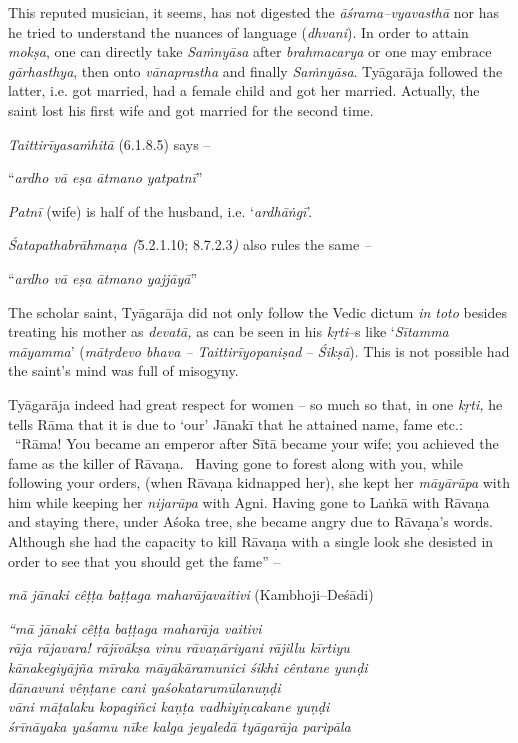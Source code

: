 This reputed musician, it seems, has not digested the \textit{āśrama–vyavasthā} nor has he tried to understand the nuances of language (\textit{dhvani}). In order to attain \textit{mokṣa}, one can directly take \textit{Saṁnyāsa} after \textit{brahmacarya} or one may embrace \textit{gārhasthya}, then onto \textit{vānaprastha} and finally \textit{Saṁnyāsa}. Tyāgarāja followed the latter, i.e. got married, had a female child and got her married. Actually, the saint lost his first wife and got married for the second time.

\textit{Taittirīyasaṁhitā} (6.1.8.5) says –

\begin{myquote}
“\textit{ardho vā eṣa ātmano yatpatnī}”
\end{myquote}

\textit{Patnī} (wife) is half of the husband, i.e. ‘\textit{ardhāṅgī}’.

\textit{Śatapathabrāhmaṇa (}5.2.1.10; 8.7.2.3\textit{)} also rules the same \textit{–}

\begin{myquote}
\textit{}“\textit{ardho vā eṣa ātmano yajjāyā}”
\end{myquote}

The scholar saint, Tyāgarāja did not only follow the Vedic dictum \textit{in toto} besides treating his mother as \textit{devatā,} as can be seen in his \textit{kṛti}–s like ‘\textit{Sītamma māyamma}’ (\textit{mātṛdevo bhava – Taittirīyopaniṣad} – \textit{Śikṣā}). This is not possible had the saint’s mind was full of misogyny.

Tyāgarāja indeed had great respect for women – so much so that, in one \textit{kṛti,} he tells Rāma that it is due to ‘our’ Jānakī that he attained name, fame etc.:  “Rāma! You became an emperor after Sītā became your wife; you achieved the fame as the killer of Rāvaṇa.  Having gone to forest along with you, while following your orders, (when Rāvaṇa kidnapped her), she kept her \textit{māyārūpa} with him while keeping her \textit{nijarūpa} with Agni. Having gone to Laṅkā with Rāvaṇa and staying there, under Aśoka tree, she became angry due to Rāvaṇa’s words. Although she had the capacity to kill Rāvaṇa with a single look she desisted in order to see that you should get the fame” –  

\textit{mā jānaki cêṭṭa baṭṭaga maharājavaitivi} (Kambhoji–Deśādi)

\begin{myquote}
\textit{“mā jānaki cêṭṭa baṭṭaga maharāja vaitivi}\\\textit{rāja rājavara! rājīvākṣa vinu rāvaṇāriyani rājillu kīrtiyu}\\\textit{kānakegiyājña mīraka māyākāramunici śikhi cêntane yunḍi}\\\textit{dānavuni vêṇṭane cani yaśokatarumūlanuṇḍi}\\\textit{vāni māṭalaku kopagiñci kaṇṭa vadhiyiṇcakane yuṇḍi} \\\textit{śrīnāyaka yaśamu nīke kalga jeyaledā tyāgarāja paripāla}
\end{myquote}


